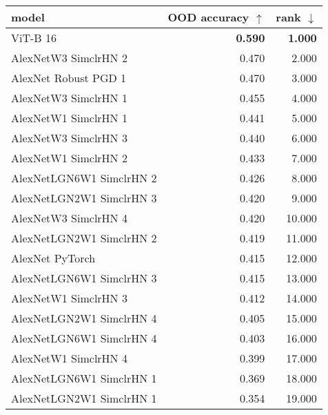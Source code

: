 \begin{tabular}{lrr}
\toprule
model & OOD accuracy $\uparrow$ & rank $\downarrow$ \\
\midrule
ViT-B 16 & \textbf{0.590} & \textbf{1.000} \\
AlexNetW3 SimclrHN 2 & 0.470 & 2.000 \\
AlexNet Robust PGD 1 & 0.470 & 3.000 \\
AlexNetW3 SimclrHN 1 & 0.455 & 4.000 \\
AlexNetW1 SimclrHN 1 & 0.441 & 5.000 \\
AlexNetW3 SimclrHN 3 & 0.440 & 6.000 \\
AlexNetW1 SimclrHN 2 & 0.433 & 7.000 \\
AlexNetLGN6W1 SimclrHN 2 & 0.426 & 8.000 \\
AlexNetLGN2W1 SimclrHN 3 & 0.420 & 9.000 \\
AlexNetW3 SimclrHN 4 & 0.420 & 10.000 \\
AlexNetLGN2W1 SimclrHN 2 & 0.419 & 11.000 \\
AlexNet PyTorch & 0.415 & 12.000 \\
AlexNetLGN6W1 SimclrHN 3 & 0.415 & 13.000 \\
AlexNetW1 SimclrHN 3 & 0.412 & 14.000 \\
AlexNetLGN2W1 SimclrHN 4 & 0.405 & 15.000 \\
AlexNetLGN6W1 SimclrHN 4 & 0.403 & 16.000 \\
AlexNetW1 SimclrHN 4 & 0.399 & 17.000 \\
AlexNetLGN6W1 SimclrHN 1 & 0.369 & 18.000 \\
AlexNetLGN2W1 SimclrHN 1 & 0.354 & 19.000 \\
\bottomrule
\end{tabular}

